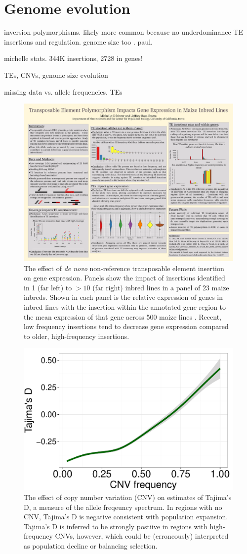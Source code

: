 \documentclass[11pt]{article}
\begin{document}
\section*{Genome evolution}

inversion polymorphisms. likely more common because no underdominance \citep{maguire1966relationship}
TE insertions \citep{studer2011identification, makarevitch2015transposable} and regulation. 
genome size too \citep{tenaillon2011genome}. paul.

michelle stats. 344K insertions, 2728 in genes!

TEs, CNVs, genome size evolution

missing data vs. allele frequencies.
TEs






\begin{figure}[tb]
\includegraphics[width=0.45\linewidth]{figs/te_expression.pdf}
\caption{The effect of \emph{de novo} non-reference transposable element insertion on gene expression. Panels show the impact of insertions identified in 1 (far left) to $>10$ (far right) inbred lines in a panel of 23 maize inbreds.  Shown in each panel is the relative expression of genes in inbred lines with the insertion within the annotated gene region to the mean expression of that gene across 500 maize lines \citep{hirsch2014insights}. Recent, low frequency insertions tend to decrease gene expression compared to older, high-frequency insertions.  } 
\label{fig:te_expression}
\end{figure}

\begin{figure}
\includegraphics[width=0.3\linewidth]{figs/td_cnv.pdf}
\caption{The effect of copy number variation (CNV) on estimates of Tajima's D, a measure of the allele freqeuncy spectrum. In regions with no CNV, Tajima's D is negative consistent with population expansion. Tajima's D is inferred to be strongly postiive in regions with high-frequency CNVs, however, which could be (erroneously) interpreted as population decline or balancing selection.} 
\label{fig:tajd}
\end{figure}
%
\end{document}

